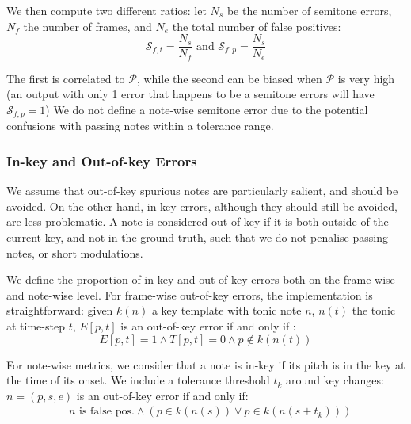 \documentclass{article}
\begin{document}
\vspace{-0.2cm}
We then compute two different ratios: let $N_s$ be the number of semitone errors, $N_f$ the number of frames, and $N_e$ the total number of false positives:
\vspace{-0.2cm}
\[
\mathcal{S}_{f,t} = \frac{N_s}{N_f} \textrm{ and } \mathcal{S}_{f,p} = \frac{N_s}{N_e}
\]

\vspace{-0.2cm}
The first is correlated to $\mathcal{P}$, while the second can be biased when $\mathcal{P}$ is very high (an output with only 1 error that happens to be a semitone errors will have $\mathcal{S}_{f,p}=1$)
%
We do not define a note-wise semitone error due to the potential confusions with passing notes within a tolerance range.

\subsubsection{In-key and Out-of-key Errors}
\label{sec:outkey}

We assume that out-of-key spurious notes are particularly salient, and should be avoided. On the other hand, in-key errors, although they should still be avoided, are less problematic. A note is considered out of key if it is both outside of the current key, and not in the ground truth, such that we do not penalise passing notes, or short modulations.

We define the proportion of in-key and out-of-key errors both on the frame-wise and note-wise level.
For frame-wise out-of-key errors, the implementation is straightforward: given $k(n)$ a key template with tonic note $n$, $n(t)$ the tonic at time-step $t$,
$E[p,t]$ is an out-of-key error if and only if :
\vspace{-0.2cm}
\[
E[p,t] = 1 \wedge T[p,t] = 0 \wedge p \notin k(n(t))
\]

\vspace{-0.2cm}
For note-wise metrics, we consider that a note is in-key if its pitch is in the key at the time of its onset. We include a tolerance threshold $t_k$ around key changes: $n=(p,s,e)$ is an out-of-key error
if and only if: 
\vspace{-0.2cm}
\setlength{\jot}{0pt}
\begin{align*}
& n \text{ is false pos.} \wedge (p \in k(n(s)) \vee p \in k(n(s + t_k)))
\end{align*}
\end{document}
